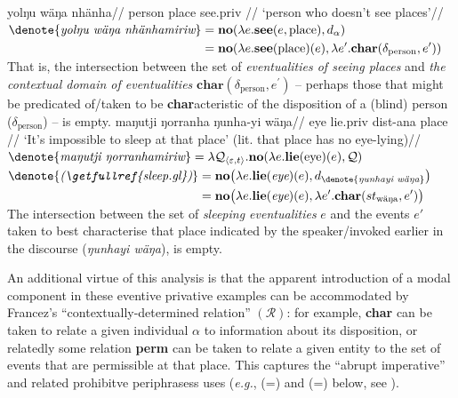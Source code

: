 \pex 
\a\begingl\gla yolŋu wäŋa nhänha//
\glb person place see.\IV\textdblhyphen\gls{priv} //
\glft`person who doesn't see places'//\endgl
\a$\begin{aligned}[t]\denote{\textit{yolŋu wäŋa nhänhamiriw}}&=\textbf{no}(\lambda e.\textbf{see}(e,\text{place}),d_\alpha)\\
	&=\textbf{no}(\lambda e.\textbf{see}(\text{place})(e),\lambda e^\prime.\textbf{char}(\delta_{\text{person}},e^\prime))\end{aligned}$
\a 	That is, the intersection between the set of \textit{eventualities of seeing places} and \textit{the contextual domain of eventualities} $\textbf{char}(\delta_{\text{person}},e^\prime)$ -- perhaps those that might be predicated of/taken to be \textbf{char}acteristic of the disposition of a (blind) person ($\delta_\text{person}$) -- is empty.
\xe
\pex \a\begingl\gla maŋutji ŋorranha ŋunha-yi wäŋa//
\glb eye lie.\IV\textdblhyphen\gls{priv} \gls{dist}-\gls{ana} place //
\glft`It's impossible to sleep at that place' (lit. that place has no eye-lying)//\endgl
\a $\denote{\textit{maŋutji ŋorranhamiriw}}=\lambda\mathcal Q_{\langle\varepsilon,t\rangle}.\textbf{no}(\lambda e.\textbf{lie}(\text{eye})(e),\mathcal Q)$
\a$ \begin{aligned}[t]
	\denote{\textit{(\getfullref{sleep.gl})}}&=\textbf{no}\big(\lambda e.\textbf{lie}(\textit{eye})(e),d_{\denote{\textit{ŋunhayi~wäŋa}}}\big)\\
	&=\textbf{no}\big(\lambda e.\textbf{lie}(\textit{eye})(e),\lambda e'.\textbf{char}(st_\text{wäŋa},e')\big)
\end{aligned} $
\a The intersection between the set of \textit{sleeping eventualities} $ e $ and the events $ e' $ taken to best characterise that place indicated by the speaker/invoked earlier in the discourse (\textit{ŋunhayi wäŋa}), is empty.
	\xe


	
	An additional virtue of this analysis is that the apparent introduction of a modal component in these eventive privative examples can be accommodated by Francez's \citeyearpar{Francez2007} ``contextually-determined relation'' $ (\mathcal R) $: for example, \textbf{char} can be taken to relate a given individual $ \alpha $ to information about its disposition, or relatedly some relation \textbf{perm} can be taken to relate a given entity to the set of events that are permissible at that place. This captures the ``abrupt imperative'' and related prohibitve periphrasess uses (\textit{e.g.}, (=) and (=\anextx) below, see \citealt[448]{Wilkinson1991}).
	

